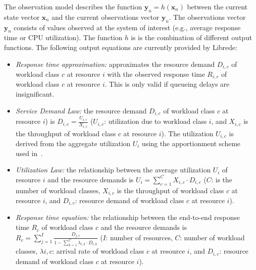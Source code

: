 The observation model describes the function $\mathbf{y}_n = h(\mathbf{x}_n)$ between the current state vector $\mathbf{x}_n$ and the current observations vector $\mathbf{y}_n$. The observations vector $\mathbf{y}_n$ consists of values observed at the system of interest (e.g., average response time or CPU utilization). The function $h$ is is the combination of different output functions. The following output equations are currently provided by Librede:
\begin{itemize}
\item \emph{Response time approximation:} approximates the resource demand  $D_{i,c}$ of workload class $c$ at resource $i$ with the observed response time $R_{i,c}$ of workload class $c$ at resource $i$. This is only valid if queueing delays are insignificant.
\item \emph{Service Demand Law:} the resource demand $D_{i,c}$ of workload class $c$ at resource $i$) is $D_{i,c} = \frac{U_{i,c}}{X_{i,c}}$ ($U_{i,c}$: utilization due to workload class $i$, and $X_{i,c}$ is the throughput of workload class $c$ at resource $i$). The utilization $U_{i,c}$ is derived from the aggregate utilization $U_i$ using the apportionment scheme used in~\cite{Brosig_Huber_Kounev_2011}.
\item \emph{Utilization Law:} the relationship between the average utilization $U_i$ of resource $i$ and the resource demands is $U_{i} = \sum_{c=1}^{C} X_{i,c} \cdot D_{i,c}$ ($C$: is the number of workload classes, $X_{i,c}$ is the throughput of workload class $c$ at resource $i$, and $D_{i,c}$: resource demand of workload class $c$ at resource $i$).
\item \emph{Response time equation:} the relationship between the end-to-end response time $R_c$ of workload class $c$ and the resource demands is $R_c = \sum_{j=1}^{I} \frac{D_{j,c}}{1-\sum_{k=1}^{C} \lambda_{i,k} \cdot D_{i,k}}$ ($I$: number of resources, $C$: number of workload classes, $\lambda{i,c}$: arrival rate of workload class $c$ at resource $i$, and $D_{i,c}$: resource demand of workload class $c$ at resource $i$).
\end{itemize}

